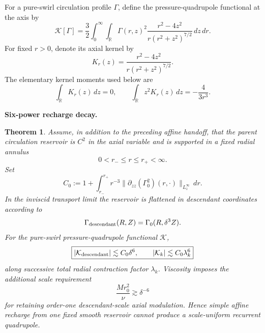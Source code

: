 \documentclass[11pt]{article}
\newtheorem{theorem}{Theorem}[section]
\theoremstyle{definition}\newtheorem{definition}[theorem]{Definition}
\theoremstyle{remark}\newtheorem{remark}[theorem]{Remark}
\newcommand{\R}{\mathbb R}\newcommand{\dd}{\,d}\newcommand{\HH}{\mathcal H}
\begin{document}
For a pure-swirl circulation profile $\Gamma$, define the pressure-quadrupole functional at the axis by
\[
 \mathcal K[\Gamma]
 =\frac32\int_0^\infty\int_{\R}
 \Gamma(r,z)^2
 \frac{r^2-4z^2}{r(r^2+z^2)^{7/2}}\,dz\,dr.
\]
For fixed $r>0$, denote its axial kernel by
\[
 K_r(z)=\frac{r^2-4z^2}{r(r^2+z^2)^{7/2}}.
\]
The elementary kernel moments used below are
\[
 \int_{\R}K_r(z)\,dz=0,
 \qquad
 \int_{\R}z^2K_r(z)\,dz=-\frac4{3r^3}.
\]

\medskip
\noindent\textbf{Six-power recharge decay.}
\begin{theorem}\label{thm:sixpower}
Assume, in addition to the preceding affine handoff, that the parent circulation reservoir is $C^2$ in the axial variable and is supported in a fixed radial annulus
\[
 0<r_-\le r\le r_+<\infty.
\]
Set
\[
 C_0:=1+\int_{r_-}^{r_+}r^{-3}
 \|\partial_{zz}(\Gamma_0^2)(r,\cdot)\|_{L^\infty_z}\,dr.
\]
In the inviscid transport limit the reservoir is flattened in descendant coordinates according to
\[
\Gamma_{\rm descendant}(R,Z)=\Gamma_0(R,\delta^3Z).
\]
For the pure-swirl pressure-quadrupole functional \(\mathcal K\),
\[
\boxed{
|\mathcal K_{\rm descendant}|\lesssim C_0\delta^6,
\qquad
|\mathcal K_k|\lesssim C_0\lambda_k^6
}
\]
along successive total radial contraction factor \(\lambda_k\).
Viscosity imposes the additional scale requirement
\[
\boxed{
\frac{Mr_0^2}{\nu}\gtrsim \delta^{-6}
}
\]
for retaining order-one descendant-scale axial modulation.  Hence simple affine
recharge from one fixed smooth reservoir cannot produce a scale-uniform
recurrent quadrupole.
\end{theorem}
\end{document}
